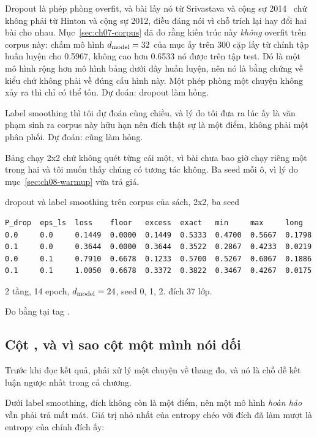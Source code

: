 Dropout là phép phòng overfit, và bài lấy nó từ Srivastava và cộng sự
2014~\autocite{srivastava2014dropout} chứ không phải từ Hinton và cộng sự 2012,
điều đáng nói vì chỗ trích lại hay đổi hai bài cho nhau.
Mục~\ref{sec:ch07-corpus} đã đo rằng kiến trúc
này \emph{không} overfit trên corpus này: chấm mô hình \(d_{\mathrm{model}} = 32\) của mục
ấy trên 300 cặp lấy từ chính tập huấn luyện cho 0.5967, không cao hơn 0.6533 nó
được trên tập test. Đó là một mô hình rộng hơn mô hình bảng dưới đây huấn luyện,
nên nó là bằng chứng về kiểu chứ không phải về đúng cấu hình này. Một phép phòng
một chuyện không xảy ra thì chỉ có thể tốn. Dự đoán: dropout làm hỏng.

Label smoothing thì tôi dự đoán cùng chiều, và lý do tôi đưa ra lúc ấy là văn
phạm sinh ra corpus này hữu hạn nên đích thật sự là một điểm, không phải một
phân phối. Dự đoán: cũng làm hỏng.

Bảng chạy 2x2 chứ không quét từng cái một, vì bài chưa bao giờ chạy riêng một
trong hai và tôi muốn thấy chúng có tương tác không. Ba seed mỗi ô, vì lý do
mục~\ref{sec:ch08-warmup} vừa trả giá.

\begin{measured}{dropout và label smoothing trên corpus của sách, 2x2, ba seed}
\begin{verbatim}
P_drop  eps_ls  loss    floor   excess  exact   min     max     long
0.0     0.0     0.1449  0.0000  0.1449  0.5333  0.4700  0.5667  0.1798
0.1     0.0     0.3644  0.0000  0.3644  0.3522  0.2867  0.4233  0.0219
0.0     0.1     0.7910  0.6678  0.1233  0.5700  0.5267  0.6067  0.1886
0.1     0.1     1.0050  0.6678  0.3372  0.3822  0.3467  0.4267  0.0175
\end{verbatim}

2 tầng, 14 epoch, \(d_{\mathrm{model}} = 24\), seed 0, 1, 2.  đích
37 lớp.

Đo bằng  tại tag .
\end{measured}

\subsection*{Cột , và vì sao cột  một mình nói dối}

%
Trước khi đọc kết quả, phải xử lý một chuyện về thang đo, và nó là chỗ dễ kết
luận ngược nhất trong cả chương.

Dưới label smoothing, đích không còn là một điểm, nên một mô hình \emph{hoàn
hảo} vẫn phải trả mất mát. Giá trị nhỏ nhất của entropy chéo với đích đã làm
mượt là entropy của chính đích ấy:

